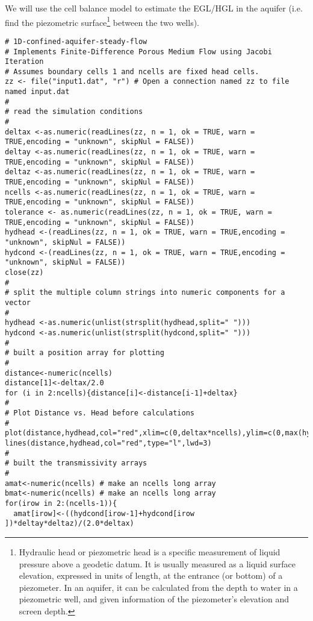 We will use the cell balance model to estimate the EGL/HGL in the aquifer (i.e. find the piezometric surface\footnote{Hydraulic head or piezometric head is a specific measurement of liquid pressure above a geodetic datum. It is usually measured as a liquid surface elevation, expressed in units of length, at the entrance (or bottom) of a piezometer. In an aquifer, it can be calculated from the depth to water in a piezometric well, and given information of the piezometer's elevation and screen depth.} between the two wells).

\begin{lstlisting}[caption=R code demonstrating an Aquifer Flow Simulator for Steady Flow \\ This fragment of code contains ..., label=lst:AquiferFlowSteady1Dimensional]
# 1D-confined-aquifer-steady-flow
# Implements Finite-Difference Porous Medium Flow using Jacobi Iteration
# Assumes boundary cells 1 and ncells are fixed head cells.
zz <- file("input1.dat", "r") # Open a connection named zz to file named input.dat
#
# read the simulation conditions
#
deltax <-as.numeric(readLines(zz, n = 1, ok = TRUE, warn = TRUE,encoding = "unknown", skipNul = FALSE))
deltay <-as.numeric(readLines(zz, n = 1, ok = TRUE, warn = TRUE,encoding = "unknown", skipNul = FALSE))
deltaz <-as.numeric(readLines(zz, n = 1, ok = TRUE, warn = TRUE,encoding = "unknown", skipNul = FALSE))
ncells <-as.numeric(readLines(zz, n = 1, ok = TRUE, warn = TRUE,encoding = "unknown", skipNul = FALSE))
tolerance <- as.numeric(readLines(zz, n = 1, ok = TRUE, warn = TRUE,encoding = "unknown", skipNul = FALSE))
hydhead <-(readLines(zz, n = 1, ok = TRUE, warn = TRUE,encoding = "unknown", skipNul = FALSE))
hydcond <-(readLines(zz, n = 1, ok = TRUE, warn = TRUE,encoding = "unknown", skipNul = FALSE))
close(zz)
#
# split the multiple column strings into numeric components for a vector
#
hydhead <-as.numeric(unlist(strsplit(hydhead,split=" ")))
hydcond <-as.numeric(unlist(strsplit(hydcond,split=" ")))
#
# built a position array for plotting
#
distance<-numeric(ncells)
distance[1]<-deltax/2.0
for (i in 2:ncells){distance[i]<-distance[i-1]+deltax}
#
# Plot Distance vs. Head before calculations
#
plot(distance,hydhead,col="red",xlim=c(0,deltax*ncells),ylim=c(0,max(hydhead)*2.0),pch=21,tck=1)
lines(distance,hydhead,col="red",type="l",lwd=3)
#
# built the transmissivity arrays
#
amat<-numeric(ncells) # make an ncells long array
bmat<-numeric(ncells) # make an ncells long array
for(irow in 2:(ncells-1)){
  amat[irow]<-((hydcond[irow-1]+hydcond[irow  ])*deltay*deltaz)/(2.0*deltax)

\end{lstlisting}
